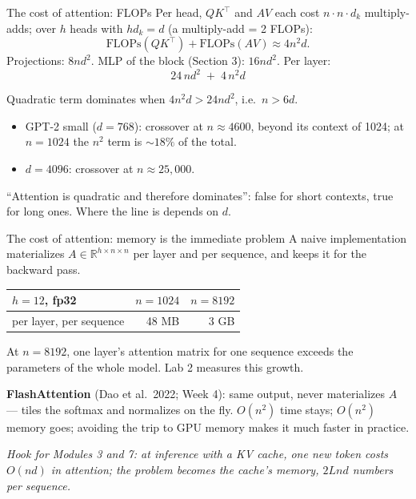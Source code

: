 \documentclass[11pt,aspectratio=169]{beamer}
\newcommand{\R}{\mathbb{R}}
\newcommand{\T}{^{\top}}
\newcommand{\dest}[1]{\textcolor{structure}{\textbf{#1}}}
\newcommand{\hook}[1]{{\small\textcolor{gray!60!black}{\textit{#1}}}}
\begin{document}
\begin{frame}{The cost of attention: FLOPs}
  Per head, $QK\T$ and $AV$ each cost $n\cdot n\cdot d_k$ multiply-adds; over $h$ heads
  with $hd_k = d$ (a multiply-add = 2 FLOPs):
  \[
    \text{FLOPs}(QK\T) + \text{FLOPs}(AV) \approx 4n^2d .
  \]
  Projections: $8nd^2$. MLP of the block (Section 3): $16nd^2$. Per layer:
  \[
    \boxed{\;24\,nd^2 \;+\; 4\,n^2d\;}
  \]

  \vspace{0.6em}
  Quadratic term dominates when $4n^2d > 24nd^2$, i.e.\ \dest{$n > 6d$}.
  \begin{itemize}
    \item GPT-2 small ($d = 768$): crossover at $n\approx 4600$, beyond its context of 1024;
          at $n = 1024$ the $n^2$ term is $\sim\!18\%$ of the total.
    \item $d = 4096$: crossover at $n\approx 25{,}000$.
  \end{itemize}
  ``Attention is quadratic and therefore dominates'': false for short contexts, true for
  long ones. Where the line is depends on $d$.
\end{frame}

\begin{frame}{The cost of attention: memory is the immediate problem}
  A naive implementation materializes $A\in\R^{h\times n\times n}$ per layer and per
  sequence, and keeps it for the backward pass.

  \vspace{0.6em}
  \begin{center}
  \begin{tabular}{@{}lrr@{}}
    \toprule
    $h = 12$, fp32 & $n = 1024$ & $n = 8192$ \\
    \midrule
    per layer, per sequence & 48 MB & 3 GB \\
    \bottomrule
  \end{tabular}
  \end{center}

  \vspace{0.6em}
  At $n = 8192$, one layer's attention matrix for one sequence exceeds the parameters of the
  whole model. Lab 2 measures this growth.

  \vspace{0.8em}
  \dest{FlashAttention} (Dao et al.\ 2022; Week 4): same output, never materializes $A$ ---
  tiles the softmax and normalizes on the fly. $O(n^2)$ time stays; $O(n^2)$ memory goes;
  avoiding the trip to GPU memory makes it much faster in practice.

  \vspace{0.4em}
  \hook{Hook for Modules 3 and 7: at inference with a KV cache, one new token costs $O(nd)$
  in attention; the problem becomes the cache's memory, $2Lnd$ numbers per sequence.}
\end{frame}
\end{document}
